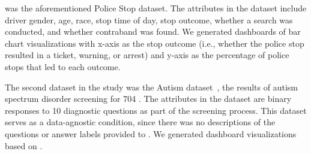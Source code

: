  was the aforementioned
Police Stop dataset.
The attributes in the dataset
include driver gender, age, race, stop time of day,
stop outcome, whether a search was conducted,
and whether contraband was found.
We generated dashboards of bar chart visualizations
with x-axis as the stop outcome
(i.e., whether the police stop resulted in a
ticket, warning, or arrest) and y-axis as the percentage of police stops that led to each outcome. %

The second dataset in the study
was the Autism dataset~\cite{autism},
 the results of autism spectrum
disorder screening for 704 .
The attributes in the dataset are binary responses
to 10 diagnostic questions
as part of the screening process.
This dataset serves as a data-agnostic condition,
since there was no descriptions
of the questions or answer labels provided to
.
We generated dashboard visualizations
based on .

